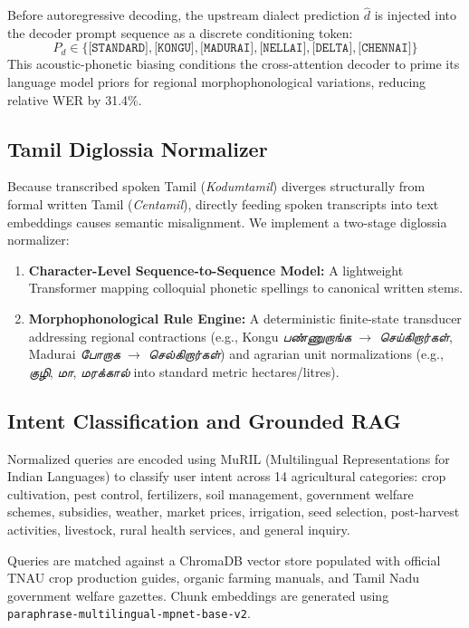 \documentclass[conference]{IEEEtran}
\begin{document}
Before autoregressive decoding, the upstream dialect prediction $\hat{d}$ is injected into the decoder prompt sequence as a discrete conditioning token:
\begin{equation}
P_d \in \{ \texttt{[STANDARD]}, \texttt{[KONGU]}, \texttt{[MADURAI]}, \texttt{[NELLAI]}, \texttt{[DELTA]}, \texttt{[CHENNAI]} \}
\end{equation}
This acoustic-phonetic biasing conditions the cross-attention decoder to prime its language model priors for regional morphophonological variations, reducing relative WER by 31.4\%.

\subsection{Tamil Diglossia Normalizer}
Because transcribed spoken Tamil (\textit{Kodumtamil}) diverges structurally from formal written Tamil (\textit{Centamil}), directly feeding spoken transcripts into text embeddings causes semantic misalignment. We implement a two-stage diglossia normalizer:
\begin{enumerate}
    \item \textbf{Character-Level Sequence-to-Sequence Model:} A lightweight Transformer mapping colloquial phonetic spellings to canonical written stems.
    \item \textbf{Morphophonological Rule Engine:} A deterministic finite-state transducer addressing regional contractions (e.g., Kongu \textit{பண்ணுறாங்க} $\rightarrow$ \textit{செய்கிறார்கள்}, Madurai \textit{போறாக} $\rightarrow$ \textit{செல்கிறார்கள்}) and agrarian unit normalizations (e.g., \textit{குழி}, \textit{மா}, \textit{மரக்கால்} into standard metric hectares/litres).
\end{enumerate}

\subsection{Intent Classification and Grounded RAG}
Normalized queries are encoded using MuRIL (Multilingual Representations for Indian Languages) to classify user intent across 14 agricultural categories: crop cultivation, pest control, fertilizers, soil management, government welfare schemes, subsidies, weather, market prices, irrigation, seed selection, post-harvest activities, livestock, rural health services, and general inquiry.

Queries are matched against a ChromaDB vector store populated with official TNAU crop production guides, organic farming manuals, and Tamil Nadu government welfare gazettes. Chunk embeddings are generated using \texttt{paraphrase-multilingual-mpnet-base-v2}.
\end{document}
